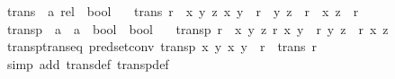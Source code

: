 \begin{isabellebody}
\endisatagproof
{\isafoldproof}%
%
\isadelimproof
%
\endisadelimproof
%
\isadelimdocument
%
\endisadelimdocument
%
\isatagdocument
%
\isamarkuptrue%
%
\endisatagdocument
{\isafolddocument}%
%
\isadelimdocument
%
\endisadelimdocument
{}\isamarkupfalse%
\ trans\ {\isacharcolon}{\kern0pt}{\isacharcolon}{\kern0pt}\ {\isachardoublequoteopen}{\isacharprime}{\kern0pt}a\ rel\ {\isasymRightarrow}\ bool{\isachardoublequoteclose}\isanewline
\ \ \ {\isachardoublequoteopen}trans\ r\ {\isasymlongleftrightarrow}\ {\isacharparenleft}{\kern0pt}{\isasymforall}x\ y\ z{\isachardot}{\kern0pt}\ {\isacharparenleft}{\kern0pt}x{\isacharcomma}{\kern0pt}\ y{\isacharparenright}{\kern0pt}\ {\isasymin}\ r\ {\isasymlongrightarrow}\ {\isacharparenleft}{\kern0pt}y{\isacharcomma}{\kern0pt}\ z{\isacharparenright}{\kern0pt}\ {\isasymin}\ r\ {\isasymlongrightarrow}\ {\isacharparenleft}{\kern0pt}x{\isacharcomma}{\kern0pt}\ z{\isacharparenright}{\kern0pt}\ {\isasymin}\ r{\isacharparenright}{\kern0pt}{\isachardoublequoteclose}\isanewline
\isanewline
{}\isamarkupfalse%
\ transp\ {\isacharcolon}{\kern0pt}{\isacharcolon}{\kern0pt}\ {\isachardoublequoteopen}{\isacharparenleft}{\kern0pt}{\isacharprime}{\kern0pt}a\ {\isasymRightarrow}\ {\isacharprime}{\kern0pt}a\ {\isasymRightarrow}\ bool{\isacharparenright}{\kern0pt}\ {\isasymRightarrow}\ bool{\isachardoublequoteclose}\isanewline
\ \ \ {\isachardoublequoteopen}transp\ r\ {\isasymlongleftrightarrow}\ {\isacharparenleft}{\kern0pt}{\isasymforall}x\ y\ z{\isachardot}{\kern0pt}\ r\ x\ y\ {\isasymlongrightarrow}\ r\ y\ z\ {\isasymlongrightarrow}\ r\ x\ z{\isacharparenright}{\kern0pt}{\isachardoublequoteclose}\isanewline
\isanewline
{}\isamarkupfalse%
\ transp{\isacharunderscore}{\kern0pt}trans{\isacharunderscore}{\kern0pt}eq\ {\isacharbrackleft}{\kern0pt}pred{\isacharunderscore}{\kern0pt}set{\isacharunderscore}{\kern0pt}conv{\isacharbrackright}{\kern0pt}{\isacharcolon}{\kern0pt}\ {\isachardoublequoteopen}transp\ {\isacharparenleft}{\kern0pt}{\isasymlambda}x\ y{\isachardot}{\kern0pt}\ {\isacharparenleft}{\kern0pt}x{\isacharcomma}{\kern0pt}\ y{\isacharparenright}{\kern0pt}\ {\isasymin}\ r{\isacharparenright}{\kern0pt}\ {\isasymlongleftrightarrow}\ trans\ r{\isachardoublequoteclose}\isanewline
%
\isadelimproof
\ \ %
\endisadelimproof
%
\isatagproof
{}\isamarkupfalse%
\ {\isacharparenleft}{\kern0pt}simp\ add{\isacharcolon}{\kern0pt}\ trans{\isacharunderscore}{\kern0pt}def\ transp{\isacharunderscore}{\kern0pt}def{\isacharparenright}{\kern0pt}%

\end{isabellebody}
